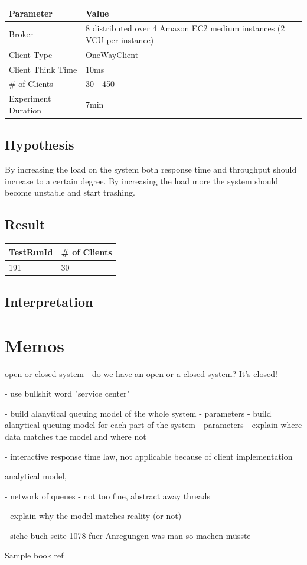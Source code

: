 \documentclass[a4paper]{article}
\begin{document}
\begin{tabular}{|l|l|}
\hline 
\textbf{Parameter} & \textbf{Value} \\ 
\hline 
Broker & 8 distributed over 4 Amazon EC2 medium  instances (2 VCU per instance)\\ 
\hline 
Client Type & OneWayClient \\ 
\hline 
Client Think Time & 10ms \\ 
\hline 
\# of Clients & 30 - 450 \\ 
\hline 
Experiment Duration & 7min \\ 
\hline 
\end{tabular} 


\subsection{Hypothesis}

By increasing the load on the system both response time and throughput should increase to
a certain degree. By increasing the load more the system should become unstable and start
trashing.

\subsection{Result}


\begin{tabular}{|l|l|}
\hline 
TestRunId & \# of Clients \\ 
\hline 
191 & 30 \\ 
\hline 
\end{tabular} 

\subsection{Interpretation}



\pagebreak

\section{Memos}

open or closed system
- do we have an open or a closed system? It's closed!

- use bullshit word "service center"

- build alanytical queuing model of the whole system
  - parameters
- build alanytical queuing model for each part of the system
  - parameters
- explain where data matches the model and where not

- interactive response time law, not applicable because of client implementation

analytical model, 


- network of queues
  - not too fine, abstract away threads
  
  
- explain why the model matches reality (or not)


- siehe buch seite 1078 fuer Anregungen was man so machen müsste

Sample book ref \cite[Page 556]{Raj}




\end{document}
